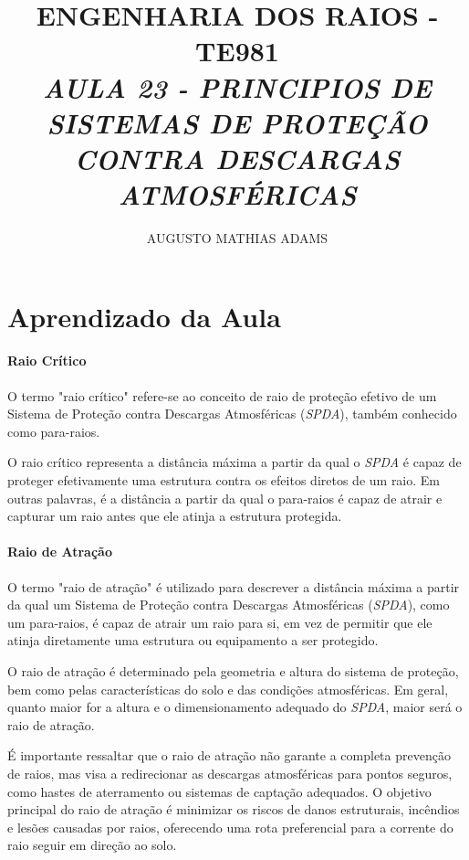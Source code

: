 \documentclass[a4paper, 12pt, onecolumn,singlespacing]{article}
\title{\normalsize{ENGENHARIA DOS RAIOS - TE981}\\ \huge{\textbf\textit{{AULA 23 - PRINCIPIOS DE SISTEMAS DE PROTEÇÃO CONTRA DESCARGAS ATMOSFÉRICAS}}\\}}
\author{\small{AUGUSTO MATHIAS ADAMS}}
\begin{document}
	
	\maketitle
	
	\section{Aprendizado da Aula}
	
		\paragraph{Raio Crítico}
		O termo "raio crítico" refere-se ao conceito de raio de proteção efetivo de um Sistema de Proteção contra Descargas Atmosféricas (\textit{SPDA}), também conhecido como para-raios.
		
		O raio crítico representa a distância máxima a partir da qual o \textit{SPDA} é capaz de proteger efetivamente uma estrutura contra os efeitos diretos de um raio. Em outras palavras, é a distância a partir da qual o para-raios é capaz de atrair e capturar um raio antes que ele atinja a estrutura protegida.
		
		\paragraph{Raio de Atração}
		
		O termo "raio de atração" é utilizado para descrever a distância máxima a partir da qual um Sistema de Proteção contra Descargas Atmosféricas (\textit{SPDA}), como um para-raios, é capaz de atrair um raio para si, em vez de permitir que ele atinja diretamente uma estrutura ou equipamento a ser protegido.
		
		O raio de atração é determinado pela geometria e altura do sistema de proteção, bem como pelas características do solo e das condições atmosféricas. Em geral, quanto maior for a altura e o dimensionamento adequado do \textit{SPDA}, maior será o raio de atração.
		
		É importante ressaltar que o raio de atração não garante a completa prevenção de raios, mas visa a redirecionar as descargas atmosféricas para pontos seguros, como hastes de aterramento ou sistemas de captação adequados. O objetivo principal do raio de atração é minimizar os riscos de danos estruturais, incêndios e lesões causadas por raios, oferecendo uma rota preferencial para a corrente do raio seguir em direção ao solo.
		
\end{document}
